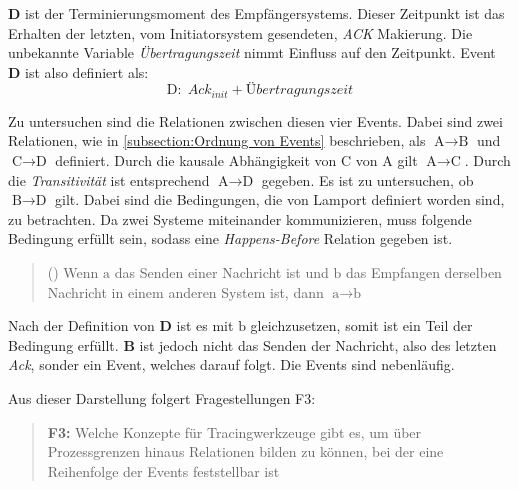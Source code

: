  \textbf{D} ist der Terminierungsmoment des Empfängersystems. Dieser Zeitpunkt ist das Erhalten der letzten, vom Initiatorsystem gesendeten, \emph{ACK} Makierung. Die unbekannte Variable \emph{Übertragungszeit} nimmt Einfluss auf den Zeitpunkt. Event \textbf{D} ist also definiert als:
 \[
 \text{D}: \; Ack_{init} + Übertragungszeit 
 \]
 
 Zu untersuchen sind die Relationen zwischen diesen vier Events.
 Dabei sind zwei Relationen, wie in \cref{subsection:Ordnung von Events} beschrieben, als $\text{A}\rightarrow\text{B}$ und $\text{C}\rightarrow\text{D}$ definiert. Durch die kausale Abhängigkeit von $\text{C}$ von $\text{A}$ gilt $\text{A}\rightarrow\text{C}$. Durch die \emph{Transitivität} ist entsprechend  $\text{A}\rightarrow\text{D}$ gegeben.  Es ist zu untersuchen, ob $\text{B}\rightarrow\text{D}$ gilt.
 Dabei sind die Bedingungen, die von Lamport definiert worden sind, zu betrachten. Da zwei Systeme miteinander kommunizieren, muss folgende Bedingung erfüllt sein, sodass eine \emph{Happens-Before} Relation gegeben ist. 
 \begin{quote}
 	() Wenn $\text{a}$ das Senden einer Nachricht ist und $\text{b}$ das Empfangen derselben Nachricht in einem anderen System ist, dann $\text{a}\rightarrow\text{b}$
 \end{quote}

Nach der Definition von \textbf{D} ist es mit $\text{b}$ gleichzusetzen, somit ist ein Teil der Bedingung erfüllt. \textbf{B} ist jedoch nicht das Senden der Nachricht, also des letzten \emph{Ack}, sonder ein Event, welches darauf folgt. Die Events sind nebenläufig. 


Aus dieser Darstellung folgert Fragestellungen F3:
\begin{quote}
	\cbstart
	\textbf{F3:} Welche Konzepte für Tracingwerkzeuge gibt es, um über Prozessgrenzen hinaus Relationen bilden zu können, bei der eine Reihenfolge der Events feststellbar ist
	\cbend
\end{quote}

